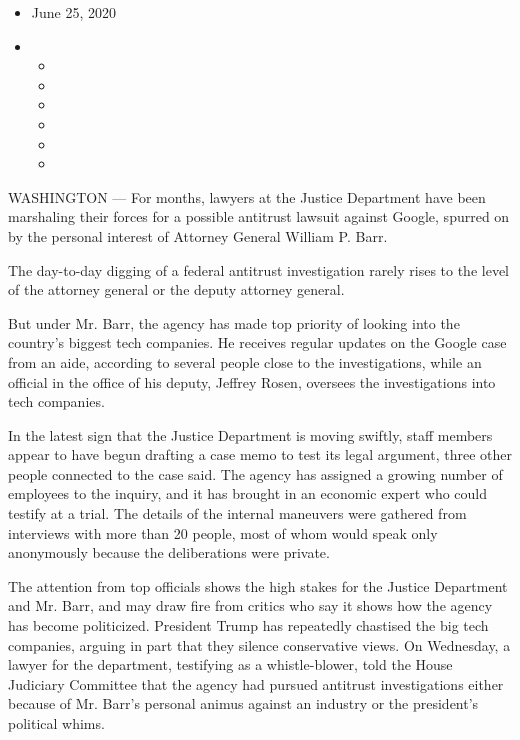 \begin{itemize}
\item
  June 25, 2020
\item
  \begin{itemize}
  \item
  \item
  \item
  \item
  \item
  \item
  \end{itemize}
\end{itemize}

WASHINGTON --- For months, lawyers at the Justice Department have been
marshaling their forces for a possible antitrust lawsuit against Google,
spurred on by the personal interest of Attorney General William P. Barr.

The day-to-day digging of a federal antitrust investigation rarely rises
to the level of the attorney general or the deputy attorney general.

But under Mr. Barr, the agency has made top priority of looking into the
country's biggest tech companies. He receives regular updates on the
Google case from an aide, according to several people close to the
investigations, while an official in the office of his deputy, Jeffrey
Rosen, oversees the investigations into tech companies.

In the latest sign that the Justice Department is moving swiftly, staff
members appear to have begun drafting a case memo to test its legal
argument, three other people connected to the case said. The agency has
assigned a growing number of employees to the inquiry, and it has
brought in an economic expert who could testify at a trial. The details
of the internal maneuvers were gathered from interviews with more than
20 people, most of whom would speak only anonymously because the
deliberations were private.

The attention from top officials shows the high stakes for the Justice
Department and Mr. Barr, and may draw fire from critics who say it shows
how the agency has become politicized. President Trump has repeatedly
chastised the big tech companies, arguing in part that they silence
conservative views. On Wednesday, a lawyer for the department,
testifying as a whistle-blower, told the House Judiciary Committee that
the agency had pursued antitrust investigations either because of Mr.
Barr's personal animus against an industry or the president's political
whims.

